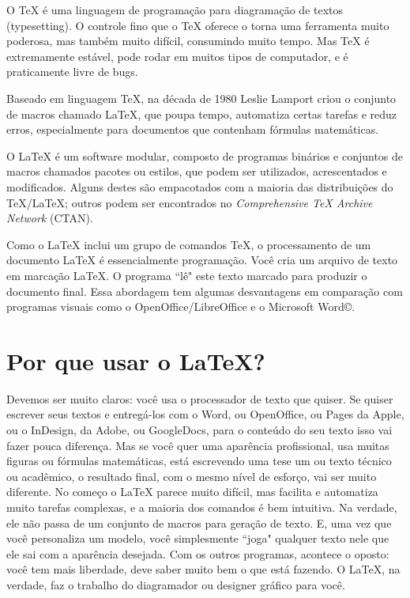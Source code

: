 \documentclass[a4paper,nols,bidi]{tufte-book}
\begin{document}
O TeX é uma linguagem de programação para diagramação de textos (typesetting). O controle fino que o TeX oferece o torna uma ferramenta muito poderosa, mas também muito difícil, consumindo muito tempo.  Mas TeX é extremamente estável, pode rodar em muitos tipos de computador, e é praticamente livre de bugs.

Baseado em linguagem \TeX, na década de 1980 Leslie Lamport criou o conjunto de macros chamado \LaTeX, que poupa tempo, automatiza certas tarefas e reduz erros, especialmente para documentos que contenham fórmulas matemáticas.

O \LaTeX{} é um software modular, composto de programas binários e conjuntos de macros chamados pacotes ou estilos, que podem ser utilizados, acrescentados e modificados. Alguns destes são empacotados com a maioria das distribuições do TeX/\LaTeX; outros podem ser encontrados no \textit{Comprehensive TeX Archive Network} (CTAN).

Como o \LaTeX{} inclui um grupo de comandos TeX, o processamento de um documento \LaTeX{} é essencialmente programação. Você cria um arquivo de texto em marcação \LaTeX. O programa ``lê" este texto marcado para produzir o documento final.
Essa abordagem tem algumas desvantagens em comparação com programas visuais como o OpenOffice/LibreOffice e o Microsoft Word©.

\section{Por que usar o \LaTeX?}

Devemos ser muito claros: você usa o processador de texto que quiser. Se quiser escrever seus textos e entregá-los com o Word, ou OpenOffice, ou Pages da Apple, ou o InDesign, da Adobe, ou GoogleDocs, para o conteúdo do seu texto isso vai fazer pouca diferença. Mas se você quer uma aparência profissional, usa muitas figuras ou fórmulas matemáticas, está escrevendo uma tese um ou texto técnico ou acadêmico, o resultado final, com o mesmo nível de esforço, vai ser muito diferente. No começo o \LaTeX{} parece muito difícil, mas facilita e automatiza muito tarefas complexas, e a maioria dos comandos é bem intuitiva. Na verdade, ele não passa de um conjunto de macros para geração de texto. E, uma vez que você personaliza um modelo, você simplesmente ``joga" qualquer texto nele que ele sai com a aparência desejada. Com os outros programas, acontece o oposto: você tem mais liberdade, deve saber muito bem o que está fazendo. O \LaTeX{}, na verdade, faz o trabalho do diagramador ou designer gráfico para você.
\end{document}
